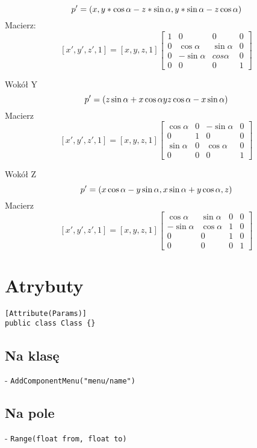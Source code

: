\documentclass{article}
\begin{document}
$$
p' = (x,\\
 y* \cos\alpha - z * \sin\alpha,\\
 y*\sin\alpha - z\cos\alpha)
$$
Macierz: 
$$
[x', y', z', 1] = [x,y,z,1]
\begin{bmatrix}
    1 &0&0&0\\
    0&\cos\alpha&\sin\alpha&0\\
    0&-\sin\alpha&cos\alpha&0\\
    0&0&0&1
\end{bmatrix}
$$

Wokół Y
$$
p' = (z\sin\alpha + x\cos\alpha\\
y\\
z\cos\alpha - x\sin\alpha)
$$
Macierz
$$
[x', y', z', 1] = [x,y,z,1]
\begin{bmatrix}
    \cos\alpha&0&-\sin\alpha&0\\
    0&1&0&0\\
    \sin\alpha&0&\cos\alpha&0\\
    0&0&0&1
\end{bmatrix}
$$

Wokół Z
$$
p' = (x\cos\alpha - y\sin\alpha,\\
x\sin\alpha + y\cos\alpha,\\
z)
$$
Macierz
$$
[x', y', z', 1] = [x,y,z,1]
\begin{bmatrix}
    \cos\alpha&\sin\alpha &0&0\\
    -\sin\alpha & \cos\alpha &1 &0\\
    0&0&1&0\\
    0&0&0&1
\end{bmatrix}
$$

\section{Atrybuty}
\begin{lstlisting}
[Attribute(Params)]
public class Class {}
\end{lstlisting}
\subsection{Na klasę}
- \verb`AddComponentMenu("menu/name")`
\subsection{Na pole}
- \verb`Range(float from, float to)`
\end{document}
